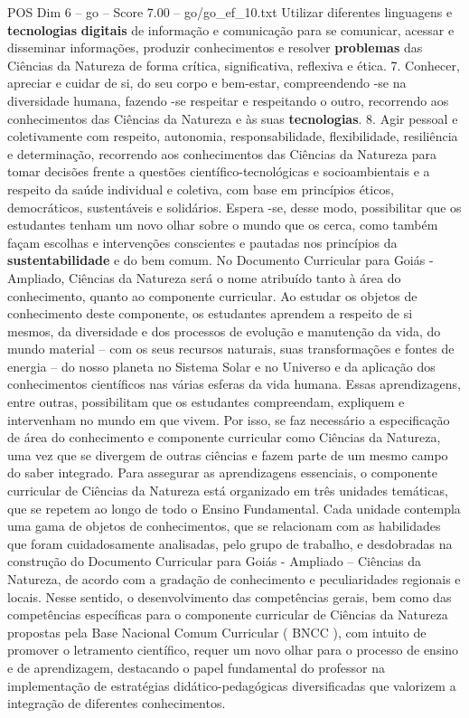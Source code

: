 \begin{textsample}{POS Dim 6 – go – Score 7.00 – go/go\_ef\_10.txt}
Utilizar diferentes linguagens e \textbf{tecnologias} \textbf{digitais} de informação e comunicação para se comunicar, acessar e disseminar informações, produzir conhecimentos e resolver \textbf{problemas} das Ciências da Natureza de forma crítica, significativa, reflexiva e ética. 7.
Conhecer, apreciar e cuidar de si, do seu corpo e bem-estar, compreendendo -se na diversidade humana, fazendo -se respeitar e respeitando o outro, recorrendo aos conhecimentos das Ciências da Natureza e às suas \textbf{tecnologias}. 8.
Agir pessoal e coletivamente com respeito, autonomia, responsabilidade, flexibilidade, resiliência e determinação, recorrendo aos conhecimentos das Ciências da Natureza para tomar decisões frente a questões científico-tecnológicas e socioambientais e a respeito da saúde individual e coletiva, com base em princípios éticos, democráticos, sustentáveis e solidários.
Espera -se, desse modo, possibilitar que os estudantes tenham um novo olhar sobre o mundo que os cerca, como também façam escolhas e intervenções conscientes e pautadas nos princípios da \textbf{sustentabilidade} e do bem comum.
No Documento Curricular para Goiás - Ampliado, Ciências da Natureza será o nome atribuído tanto à área do conhecimento, quanto ao componente curricular.
Ao estudar os objetos de conhecimento deste componente, os estudantes aprendem a respeito de si mesmos, da diversidade e dos processos de evolução e manutenção da vida, do mundo material – com os seus recursos naturais, suas transformações e fontes de energia – do nosso planeta no Sistema Solar e no Universo e da aplicação dos conhecimentos científicos nas várias esferas da vida humana.
Essas aprendizagens, entre outras, possibilitam que os estudantes compreendam, expliquem e intervenham no mundo em que vivem.
Por isso, se faz necessário a especificação de área do conhecimento e componente curricular como Ciências da Natureza, uma vez que se divergem de outras ciências e fazem parte de um mesmo campo do saber integrado.
Para assegurar as aprendizagens essenciais, o componente curricular de Ciências da Natureza está organizado em três unidades temáticas, que se repetem ao longo de todo o Ensino Fundamental.
Cada unidade contempla uma gama de objetos de conhecimentos, que se relacionam com as habilidades que foram cuidadosamente analisadas, pelo grupo de trabalho, e desdobradas na construção do Documento Curricular para Goiás - Ampliado – Ciências da Natureza, de acordo com a gradação de conhecimento e peculiaridades regionais e locais.
Nesse sentido, o desenvolvimento das competências gerais, bem como das competências específicas para o componente curricular de Ciências da Natureza propostas pela Base Nacional Comum Curricular ( BNCC ), com intuito de promover o letramento científico, requer um novo olhar para o processo de ensino e de aprendizagem, destacando o papel fundamental do professor na implementação de estratégias didático-pedagógicas diversificadas que valorizem a integração de diferentes conhecimentos.

\end{textsample}
